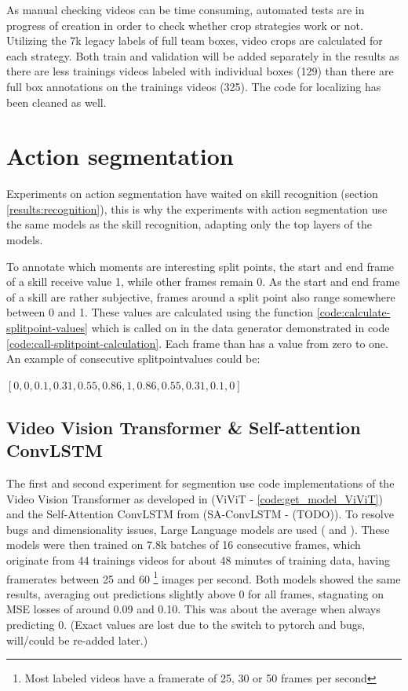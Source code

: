 As manual checking videos can be time consuming, automated tests are in progress of creation in order to check whether crop strategies work or not.
Utilizing the 7k legacy labels of full team boxes, video crops are calculated for each strategy.
Both train and validation will be added separately in the results as there are less trainings videos labeled with individual boxes (129) than there are full box annotations on the trainings videos (325).
The code for localizing has been cleaned as well. %














\section{Action segmentation}

Experiments on action segmentation have waited on skill recognition (section \ref{results:recognition}), this is why the experiments with action segmentation use the same models as the skill recognition, adapting only the top layers of the models.

To annotate which moments are interesting split points, the start and end frame of a skill receive value 1, while other frames remain 0.
As the start and end frame of a skill are rather subjective, frames around a split point also range somewhere between 0 and 1. These values are calculated using the function \ref{code:calculate-splitpoint-values} which is called on in the data generator demonstrated in code \ref{code:call-splitpoint-calculation}.
Each frame than has a value from zero to one. An example of consecutive splitpointvalues could be:

\([0, 0, 0.1, 0.31, 0.55, 0.86, 1, 0.86, 0.55, 0.31, 0.1, 0]\)


\subsection{Video Vision Transformer \& Self-attention ConvLSTM}
\label{subsec:video-models-from-scratch}

The first and second experiment for segmention use code implementations of the Video Vision Transformer as developed in \textcite{Arnab2021} (ViViT - \ref{code:get_model_ViViT}) and the Self-Attention ConvLSTM from \textcite{Lin_2020} (SA-ConvLSTM - (TODO)).
To resolve bugs and dimensionality issues, Large Language models are used (\autocite{OpenAI_ChatGPT_2025} and \autocite{Deepseek_2025}).
These models were then trained on 7.8k batches of 16 consecutive frames, which originate from 44 trainings videos for about 48 minutes of training data, having framerates between 25 and 60 \footnote{Most labeled videos have a framerate of 25, 30 or 50 frames per second} images per second.
Both models showed the same results, averaging out predictions slightly above 0 for all frames, stagnating on MSE losses of around 0.09 and 0.10. This was about the average when always predicting 0. (Exact values are lost due to the switch to pytorch and bugs, will/could be re-added later.)

